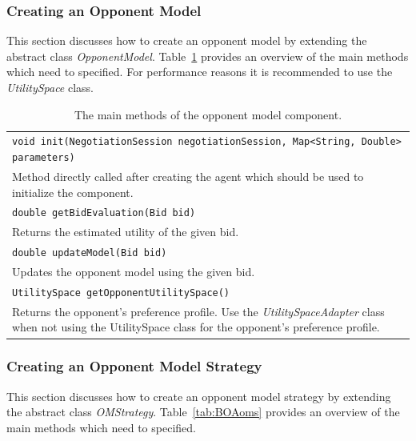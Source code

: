\documentclass[]{article}
\begin{document}
\subsubsection{Creating an Opponent Model}
This section discusses how to create an opponent model by extending the abstract class \textit{OpponentModel}. Table~\ref{tab:BOAom} provides an overview of the main methods which need to specified. For performance reasons it is recommended to use the \textit{UtilitySpace} class.

\begin{table}[h]
\begin{tabular}{m{}}
\hline
\texttt{void init(NegotiationSession negotiationSession, Map<String, Double> parameters)}\\
Method directly called after creating the agent which should be used to initialize the component.\\
\hline
\texttt{double getBidEvaluation(Bid bid)}\\
Returns the estimated utility of the given bid.\\
\hline
\texttt{double updateModel(Bid bid)}\\
Updates the opponent model using the given bid.\\
\hline
\texttt{UtilitySpace getOpponentUtilitySpace()}\\
Returns the opponent's preference profile. Use the \textit{UtilitySpaceAdapter} class when not using the UtilitySpace class for the opponent's preference profile.\\
\hline
\end{tabular}
\caption{The main methods of the opponent model component.}
\label{tab:BOAom}
\end{table}

\subsubsection{Creating an Opponent Model Strategy}
This section discusses how to create an opponent model strategy by extending the abstract class \textit{OMStrategy}. Table~\ref{tab:BOAoms} provides an overview of the main methods which need to specified.
\end{document}
